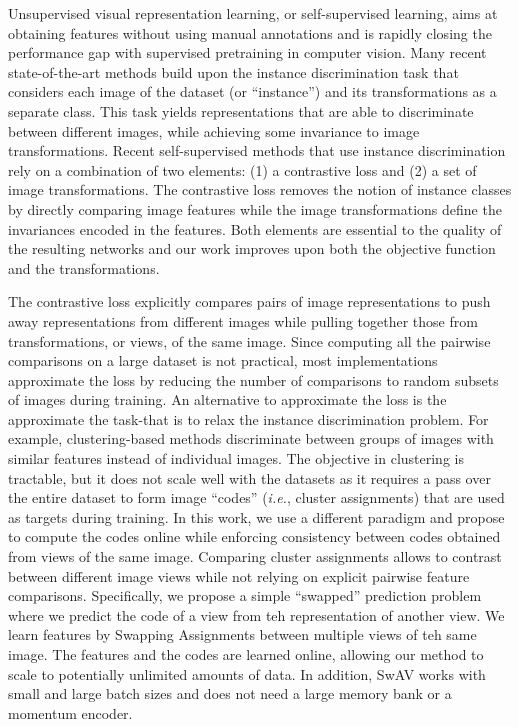 \documentclass[conference]{IEEEtran}
\begin{document}
Unsupervised visual representation learning, or self-supervised learning, aims at obtaining features without using manual annotations and is rapidly closing the performance gap with supervised pretraining in computer vision.
Many recent state-of-the-art methods build upon the instance discrimination task that considers each image of the dataset (or ``instance'') and its transformations as a separate class.
This task yields representations that are able to discriminate between different images, while achieving some invariance to image transformations.
Recent self-supervised methods that use instance discrimination rely on a combination of two elements: (1) a contrastive loss and (2) a set of image transformations.
The contrastive loss removes the notion of instance classes by directly comparing image features while the image transformations define the invariances encoded in the features.
Both elements are essential to the quality of the resulting networks and our work improves upon both the objective function and the transformations.

The contrastive loss explicitly compares pairs of image representations to push away representations from different images while pulling together those from transformations, or views, of the same image.
Since computing all the pairwise comparisons on a large dataset is not practical, most implementations approximate the loss by reducing the number of comparisons to random subsets of images during training.
An alternative to approximate the loss is the approximate the task-that is to relax the instance discrimination problem. 
For example, clustering-based methods discriminate between groups of images with similar features instead of individual images. 
The objective in clustering is tractable, but it does not scale well with the datasets as it requires a pass over the entire dataset to form image ``codes'' (\textit{i.e.}, cluster assignments) that are used as targets during training.
In this work, we use a different paradigm and propose to compute the codes online while enforcing consistency between codes obtained from views of the same image.
Comparing cluster assignments allows to contrast between different image views while not relying on explicit pairwise feature comparisons.
Specifically, we propose a simple ``swapped'' prediction problem where we predict the code of a view from teh representation of another view. 
We learn features by Swapping Assignments between multiple views of teh same image. The features and the codes are learned online, allowing our method to scale to potentially unlimited amounts of data.
In addition, SwAV works with small and large batch sizes and does not need a large memory bank or a momentum encoder.
\end{document}
